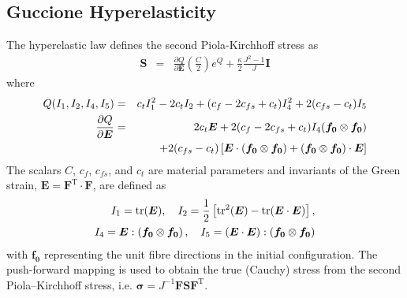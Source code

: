 \documentclass[sn-mathphys,Numbered]{sn-jnl}%
\newcommand{\bb}{\boldsymbol}
\begin{document}
\begin{appendices}
\subsection{Guccione Hyperelasticity}
\label{app:mechLaws:GH}
%
The \citet{Guccione1995} hyperelastic law defines the second Piola-Kirchhoff stress as
\begin{eqnarray}
	\boldsymbol{S}
		&=& \frac{\partial Q}{\partial \boldsymbol{E} } \left( \frac{C}{2} \right) e^Q + \frac{\kappa}{2} \frac{J^2 - 1}{J} \textbf{I}
\end{eqnarray}
where
\begin{eqnarray}
	Q(I_1, I_2, I_4, I_5) &=& c_t I_1^2 - 2 c_t I_2 + (c_f - 2c_{fs} + c_t) I_4^2   + 2(c_{fs} - c_t) I_5 \\
	\frac{\partial Q}{\partial \boldsymbol{E} }
		&=&  2 c_t \boldsymbol{E} + 2(c_f - 2 c_{fs} + c_t)I_4 ( \boldsymbol{f_0} \otimes \boldsymbol{f_0} ) \notag \\
		&&+ 2(c_{fs} - c_t)\left[\boldsymbol{E} \cdot  (\boldsymbol{f_0} \otimes \boldsymbol{f_0}) + ( \boldsymbol{f_0} \otimes \boldsymbol{f_0} ) \cdot \boldsymbol{E} \right]
\end{eqnarray}
The scalars $C$, $c_f$, $c_{fs}$, and $c_t$ are material parameters and invariants of the Green strain, $\boldsymbol{E} = \boldsymbol{F}^{\text{T}} \cdot \boldsymbol{F}$, are defined as
\begin{eqnarray}
	I_1 = \text{tr}(\boldsymbol{E}), \quad
	I_2 =  \frac{1}{2} \left[ \text{tr}^2(\boldsymbol{E}) - \text{tr}(\boldsymbol{E} \cdot \boldsymbol{E}) \right], \notag \\
	I_4 = \boldsymbol{E}  : \left( \boldsymbol{f_0} \otimes \boldsymbol{f_0} \right), \quad
	I_5 = \left( \boldsymbol{E} \cdot \boldsymbol{E} \right): \left( \boldsymbol{f_0} \otimes \boldsymbol{f_0} \right)
\end{eqnarray}
with $\boldsymbol{f_0}$ representing the unit fibre directions in the initial configuration.
%
The push-forward mapping is used to obtain the true (Cauchy) stress from the second Piola–Kirchhoff stress, i.e. $\bb{\sigma}=J^{-1}\bb{F}\bb{S}\bb{F}^{\mathrm{T}}$.
\fi
%

\end{appendices}
\end{document}
